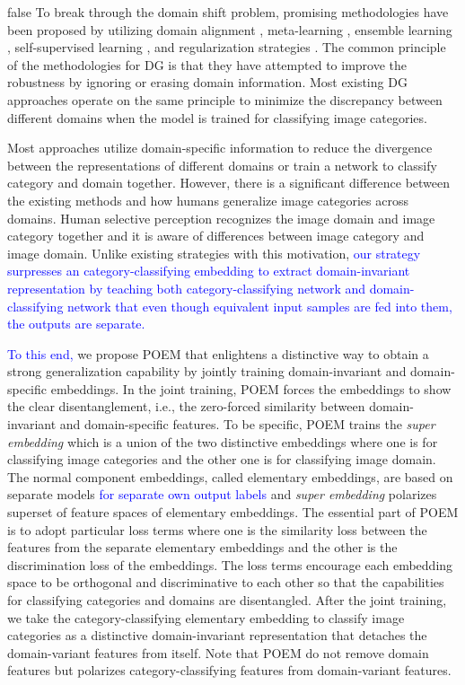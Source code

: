 \documentclass[letterpaper]{article} \usepackage{aaai23}  \usepackage{times}  \usepackage{helvet}  \usepackage{courier}  \usepackage[hyphens]{url}  \usepackage{graphicx} \urlstyle{rm} \def\UrlFont{\rm}  \usepackage{natbib}  \usepackage{caption} \frenchspacing  \setlength{\pdfpagewidth}{8.5in}  \setlength{\pdfpageheight}{11in}  \usepackage[labelsep=period]{caption}
\begin{document}
\if false
To break through the domain shift problem, promising methodologies have been proposed by utilizing domain alignment \cite{Invariant_Feature_Representation,contrastive1,KL1,MMD,Multi-Adversarial,representation_via_representations}, meta-learning \cite{MASF}, ensemble learning \cite{EoA,SWAD}, self-supervised learning \cite{multi-generalization,extrinsic_supervision_DG_MTL,jigsaw_DG_MTL}, and regularization strategies \cite{regular_1,RSC}. The common principle of the methodologies for DG is that they have attempted to improve the robustness by ignoring or erasing domain information.
Most existing DG approaches operate on the same principle to minimize the discrepancy between different domains when the model is trained for classifying image categories.



Most approaches utilize domain-specific information to reduce the divergence between the representations of different domains or train a network to classify category and domain together. 
However, there is a significant difference between the existing methods and how humans generalize image categories across domains. Human selective perception recognizes the image domain and image category together and it is aware of differences between image category and image domain. Unlike existing strategies with this motivation, \textcolor{blue}{
	our strategy surpresses an category-classifying embedding to extract domain-invariant representation by teaching both category-classifying network and domain-classifying network that even though equivalent input samples are fed into them, the outputs are separate.
}


\textcolor{blue}{To this end,} we propose POEM that enlightens a distinctive way to obtain a strong generalization capability by jointly training domain-invariant and domain-specific embeddings. In the joint training, POEM forces the embeddings to show the clear disentanglement, i.e., the zero-forced similarity between domain-invariant and domain-specific features. To be specific, POEM trains the \textit{super embedding} which is a union of the two distinctive embeddings where one is for classifying image categories and the other one is for classifying image domain. 
The normal component embeddings, called elementary embeddings, are based on separate models \textcolor{blue}{for separate own output labels} and \textit{super embedding} polarizes superset of feature spaces of elementary embeddings. The essential part of POEM is to adopt particular loss terms where one is the similarity loss between the features from the separate elementary embeddings and the other is the discrimination loss of the embeddings. 
The loss terms encourage each embedding space to be orthogonal and discriminative to each other so that the capabilities for classifying categories and domains are disentangled. After the joint training, we take the category-classifying elementary embedding to classify image categories as a distinctive domain-invariant representation that detaches the domain-variant features from itself. Note that POEM do not remove domain features but polarizes category-classifying features from domain-variant features.
\end{document}
